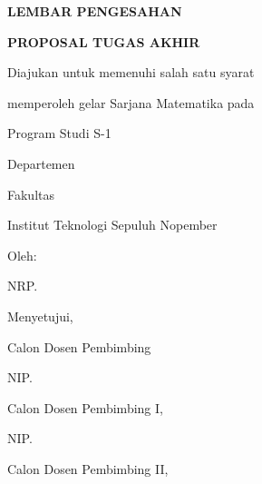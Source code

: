 \makeatletter
\begin{center}
    {\noindent\centering\textbf{\large\MakeUppercase{Lembar Pengesahan}}\par}

    \vspace{1cm}
    \textbf{\MakeUppercase{\@judul}}

    \vspace{0.5cm}
    \textbf{\MakeUppercase{\@title@}}

    \vspace{0.75cm}
    \textbf{\MakeUppercase{Proposal Tugas Akhir}}

    \vspace{0.25cm}
    Diajukan untuk memenuhi salah satu syarat

    memperoleh gelar Sarjana Matematika pada

    Program Studi S-1 \@departemen

    Departemen~\@departemen

    Fakultas~\@fakultas

    Institut Teknologi Sepuluh Nopember

    \vspace{0.5cm}
    Oleh: \textbf{\@nama}

    NRP. \@NRP

    \vspace{0.5cm}
    Menyetujui,

    \vspace{0.5cm}
    \ifthenelse{\equal{\pbb@tiga}{}\OR\equal{\pbb@tiga}{ }}
        {
            \ifthenelse{\equal{\pbb@dua}{}\OR\equal{\pbb@dua}{ }}
                {
                    Calon Dosen Pembimbing

                    \vspace{2cm}
                    \underline{\pbb@satu}
                    
                    NIP. \NIP@pbb@satu
                }
                {
                    \newlength{\twocolumns}
                    \setlength{\twocolumns}{.45\textwidth}
                    \begin{minipage}{\twocolumns}
                        \centering
                        Calon Dosen Pembimbing I,

                        \vspace{2cm}
                        \underline{\pbb@satu}
                        
                        NIP. \NIP@pbb@satu
                    \end{minipage}
                    \begin{minipage}{\twocolumns}
                        \centering
                        Calon Dosen Pembimbing II,


\end{minipage}}}
\end{center}

